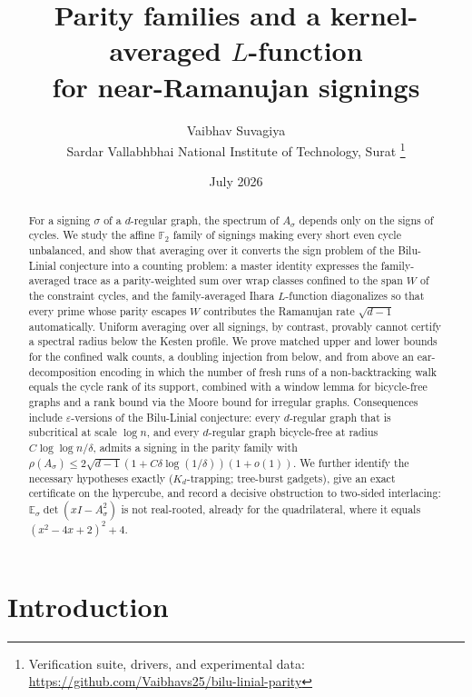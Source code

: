 \documentclass[11pt]{article}
\title{Parity families and a kernel-averaged $L$-function\\ for near-Ramanujan signings}
\author{Vaibhav Suvagiya\\
\small Sardar Vallabhbhai National Institute of Technology, Surat
\thanks{Verification suite, drivers, and experimental data:
\url{https://github.com/Vaibhavs25/bilu-linial-parity}}}
\date{July 2026}
\theoremstyle{remark}
\begin{document}
\maketitle

\begin{abstract}
For a signing $\sigma$ of a $d$-regular graph, the spectrum of
$A_\sigma$ depends only on the signs of cycles. We study the affine
$\mathbb F_2$ family of signings making every short even cycle
unbalanced, and show that averaging over it converts the sign problem
of the Bilu-Linial conjecture into a counting problem: a master
identity expresses the family-averaged trace as a parity-weighted sum
over wrap classes confined to the span $W$ of the constraint cycles,
and the family-averaged Ihara $L$-function diagonalizes so that every
prime whose parity escapes $W$ contributes the Ramanujan rate
$\sqrt{d-1}$ automatically. Uniform averaging over all signings, by
contrast, provably cannot certify a spectral radius below the Kesten
profile. We prove matched upper and lower bounds for the confined walk
counts, a doubling injection from below, and from above an
ear-decomposition encoding in which the number of fresh runs of a
non-backtracking walk equals the cycle rank of its support, combined
with a window lemma for bicycle-free graphs and a rank bound via the
Moore bound for irregular graphs. Consequences include
$\varepsilon$-versions of the Bilu-Linial conjecture: every
$d$-regular graph that is subcritical at scale $\log n$, and every
$d$-regular graph bicycle-free at radius
$C\log\log n/\delta$, admits a signing in the parity family with
$\rho(A_\sigma)\le2\sqrt{d-1}(1+C\delta\log(1/\delta))(1+o(1))$. We
further identify the necessary hypotheses exactly ($K_d$-trapping;
tree-burst gadgets), give an exact certificate on the hypercube, and
record a decisive obstruction to two-sided interlacing:
$\mathbb E_\sigma\det(xI-A_\sigma^2)$ is not real-rooted, already for
the quadrilateral, where it equals $(x^2-4x+2)^2+4$.
\end{abstract}

\section{Introduction}
\end{document}
